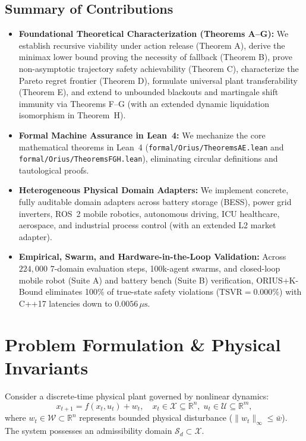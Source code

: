\documentclass[conference]{IEEEtran}
\begin{document}
\subsection{Summary of Contributions}
\begin{itemize}
    \item \textbf{Foundational Theoretical Characterization (Theorems A--G):} We establish recursive viability under action release (Theorem A), derive the minimax lower bound proving the necessity of fallback (Theorem B), prove non-asymptotic trajectory safety achievability (Theorem C), characterize the Pareto regret frontier (Theorem D), formulate universal plant transferability (Theorem E), and extend to unbounded blackouts and martingale shift immunity \cite{ville_1939} via Theorems F--G (with an extended dynamic liquidation isomorphism in Theorem~H).
    \item \textbf{Formal Machine Assurance in Lean~4:} We mechanize the core mathematical theorems in Lean~4 (\texttt{formal/Orius/\allowbreak TheoremsAE.lean} and \texttt{formal/Orius/\allowbreak TheoremsFGH.lean}), eliminating circular definitions and tautological proofs.
    \item \textbf{Heterogeneous Physical Domain Adapters:} We implement concrete, fully auditable domain adapters across battery storage (BESS), power grid inverters, ROS~2 mobile robotics, autonomous driving, ICU healthcare, aerospace, and industrial process control (with an extended L2 market adapter).
    \item \textbf{Empirical, Swarm, and Hardware-in-the-Loop Validation:} Across $224,000$ 7-domain evaluation steps, 100k-agent swarms, and closed-loop mobile robot (Suite A) and battery bench (Suite B) verification, ORIUS+K-Bound eliminates 100\% of true-state safety violations ($\text{TSVR} = 0.000\%$) with C++17 latencies down to $0.0056\,\mu\text{s}$.
\end{itemize}

\section{Problem Formulation \& Physical Invariants}
Consider a discrete-time physical plant governed by nonlinear dynamics:
\begin{equation}
x_{t+1} = f(x_t, u_t) + w_t, \quad x_t \in \mathcal{X} \subseteq \mathbb{R}^n, \; u_t \in \mathcal{U} \subseteq \mathbb{R}^m,
\end{equation}
where $w_t \in \mathcal{W} \subset \mathbb{R}^n$ represents bounded physical disturbance ($\|w_t\|_\infty \le \bar{w}$). The system possesses an admissibility domain $\mathcal{S}_d \subset \mathcal{X}$.
\end{document}
